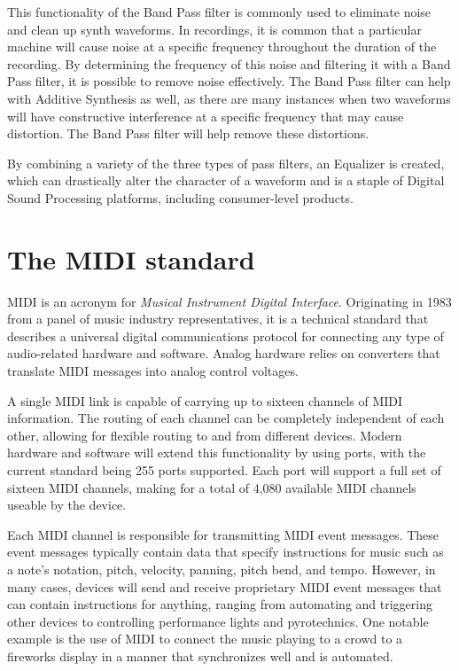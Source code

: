 \documentclass[a4paper,12pt]{report}
\begin{document}
This functionality of the Band Pass filter is commonly used to eliminate noise and clean up synth waveforms. In recordings, it is common that a particular machine will cause noise at a specific frequency throughout the duration of the recording. By determining the frequency of this noise and filtering it with a Band Pass filter, it is possible to remove noise effectively. The Band Pass filter can help with Additive Synthesis as well, as there are many instances when two waveforms will have constructive interference at a specific frequency that may cause distortion. The Band Pass filter will help remove these distortions.

By combining a variety of the three types of pass filters, an Equalizer is created, which can drastically alter the character of a waveform and is a staple of Digital Sound Processing platforms, including consumer-level products.


\section{The MIDI standard}
\label{sec:midistandard}
MIDI \cite{midihome} is an acronym for \emph{Musical Instrument Digital Interface}. Originating in 1983 from a panel of music industry representatives, it is a technical standard that describes a universal digital communications protocol for connecting any type of audio-related hardware and software. Analog hardware relies on converters that translate MIDI messages into analog control voltages. 

A single MIDI link is capable of carrying up to sixteen channels of MIDI information. The routing of each channel can be completely independent of each other, allowing for flexible routing to and from different devices. Modern hardware and software will extend this functionality by using ports, with the current standard being 255 ports supported. Each port will support a full set of sixteen MIDI channels, making for a total of 4,080 available MIDI channels useable by the device.

Each MIDI channel is responsible for transmitting MIDI event messages. These event messages typically contain data that specify instructions for music such as a note's notation, pitch, velocity, panning, pitch bend, and tempo. However, in many cases, devices will send and receive proprietary MIDI event messages that can contain instructions for anything, ranging from automating and triggering other devices to controlling performance lights and pyrotechnics. One notable example is the use of MIDI to connect the music playing to a crowd to a fireworks display in a manner that synchronizes well and is automated.
\end{document}
